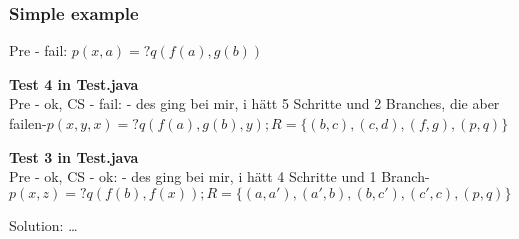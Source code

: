 		
		\begin{frame}[fragile=singleslide]
	\frametitle{Simple example}
	Pre - fail:  $p(x,a) =? q(f(a),g(b))$\\
		\vspace{0.5cm}
		
		
		\textbf{Test 4 in Test.java}\\
		Pre - ok, CS - fail: \textcolor[rgb]{0,0.58,0}{- des ging bei mir, i hätt 5 Schritte und 2 Branches, die aber failen-}$p(x,y,x) =? q(f(a),g(b),y) ; R=\{(b,c),(c,d),(f,g),(p,q)\}$\\
		\vspace{0.5cm}
		
		\textbf{Test 3 in Test.java}\\
		Pre - ok, CS - ok: \textcolor[rgb]{0,0.58,0}{- des ging bei mir, i hätt 4 Schritte und 1 Branch-}$p(x,z) =? q(f(b),f(x)) ; R=\{(a,a'),(a',b),(b,c'),(c',c),(p,q)\}$\\
		\vspace{0.5cm}
		
		Solution: \ldots
	
  \end{frame}	
	
